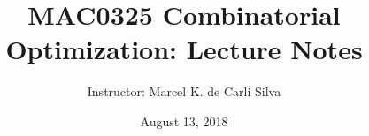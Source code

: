 \documentclass[10pt,reqno]{amsart}
\title{MAC0325 Combinatorial Optimization: Lecture Notes}
\author{Instructor: Marcel {K.} de Carli Silva}
\date{August 13, 2018}
\begin{document}
\begin{abstract}

\end{abstract}

\maketitle

\tableofcontents



\nocite{CookCPS98a}

\begingroup
\printbibliography
\endgroup
\end{document}
